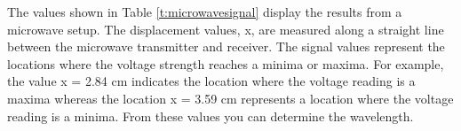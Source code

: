 \begin{multicols}{2}
The values shown in Table \ref{t:microwavesignal} display the results from a microwave setup. The displacement values, x, are measured along a straight line between the microwave transmitter and receiver. The signal values represent the locations where the voltage strength reaches a minima or maxima. For example, the value x = 2.84 cm indicates the location where the voltage reading is a maxima whereas the location x = 3.59 cm represents a location where the voltage reading is a minima. From these values you can determine the wavelength.

\end{multicols}
\endinput
